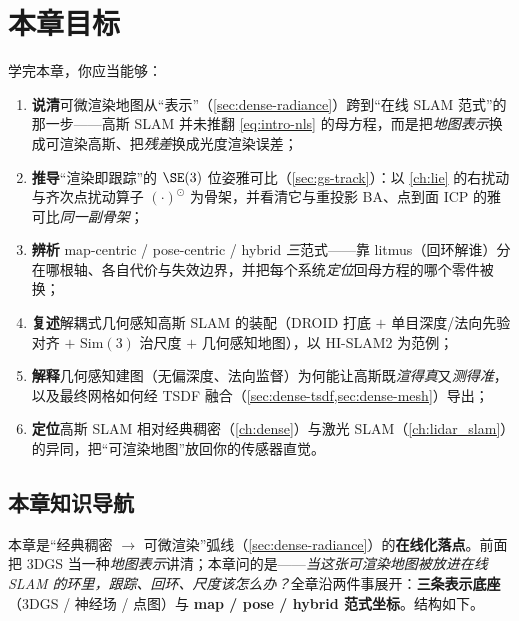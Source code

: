 \section*{本章目标}
学完本章，你应当能够：
\begin{enumerate}
  \item \textbf{说清}可微渲染地图从“表示”（\cref{sec:dense-radiance}）跨到“在线 SLAM 范式”的那一步——高斯 SLAM 并未推翻 \cref{eq:intro-nls} 的母方程，而是把\emph{地图表示}换成可渲染高斯、把\emph{残差}换成光度渲染误差；
  \item \textbf{推导}“渲染即跟踪”的 $\SE(3)$ 位姿雅可比（\cref{sec:gs-track}）：以 \cref{ch:lie} 的右扰动与齐次点扰动算子 $(\cdot)^\odot$ 为骨架，并看清它与重投影 BA、点到面 ICP 的雅可比\emph{同一副骨架}；
  \item \textbf{辨析} map-centric / pose-centric / hybrid \emph{三}范式——靠 litmus（回环解谁）分在哪根轴、各自代价与失效边界，并把每个系统\emph{定位}回母方程的哪个零件被换；
  \item \textbf{复述}解耦式几何感知高斯 SLAM 的装配（DROID 打底 $+$ 单目深度/法向先验对齐 $+$ $\mathrm{Sim}(3)$ 治尺度 $+$ 几何感知地图），以 HI-SLAM2 为范例；
  \item \textbf{解释}几何感知建图（无偏深度、法向监督）为何能让高斯既\emph{渲得真}又\emph{测得准}，以及最终网格如何经 TSDF 融合（\cref{sec:dense-tsdf,sec:dense-mesh}）导出；
  \item \textbf{定位}高斯 SLAM 相对经典稠密（\cref{ch:dense}）与激光 SLAM（\cref{ch:lidar_slam}）的异同，把“可渲染地图”放回你的传感器直觉。
\end{enumerate}

\subsection*{本章知识导航}
本章是“经典稠密 $\to$ 可微渲染”弧线（\cref{sec:dense-radiance}）的\textbf{在线化落点}。前面把 3DGS 当一种\emph{地图表示}讲清；本章问的是——\emph{当这张可渲染地图被放进在线 SLAM 的环里，跟踪、回环、尺度该怎么办？}全章沿两件事展开：\textbf{三条表示底座}（3DGS / 神经场 / 点图）与 \textbf{map / pose / hybrid 范式坐标}。结构如下。

